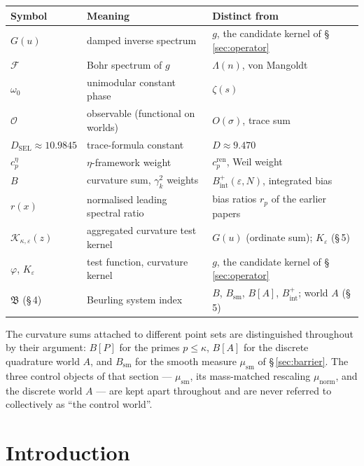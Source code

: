 \documentclass[11pt]{article}
\newcommand{\DSEL}{D_{\mathrm{SEL}}}
\newcommand{\Bsm}{B_{\mathrm{sm}}}              %
\begin{document}
\begin{center}
\begin{tabular}{lll}
\toprule
Symbol & Meaning & Distinct from \\
\midrule
$G(u)$ & damped inverse spectrum & $g$, the candidate kernel of
  \S\,\ref{sec:operator} \\
$\mathcal{F}$ & Bohr spectrum of $g$ & $\Lambda(n)$, von Mangoldt \\
$\omega_0$ & unimodular constant phase & $\zeta(s)$ \\
$\mathcal{O}$ & observable (functional on worlds) & $O(\sigma)$, trace sum \\
$\DSEL\approx 10.9845$ & trace-formula constant & $D\approx 9.470$ \\
$c_p^{\eta}$ & $\eta$-framework weight & $c_p^{\mathrm{ren}}$, Weil weight \\
$B$ & curvature sum, $\gamma_k^2$ weights &
  $B_{\mathrm{int}}^{+}(\varepsilon,N)$, integrated bias \\
$r(x)$ & normalised leading spectral ratio & bias ratios $r_p$ of the earlier
  papers \\
$\mathcal K_{\kappa,\varepsilon}(z)$ & aggregated curvature test kernel &
  $G(u)$ (ordinate sum); $K_\varepsilon$ (\S\,5) \\
$\varphi$, $K_\varepsilon$ & test function, curvature kernel & $g$, the
  candidate kernel of \S\,\ref{sec:operator} \\
$\mathfrak{B}$ (\S\,4) & Beurling system index & $B$, $\Bsm$, $B[A]$, $B_{\mathrm{int}}^{+}$; world $A$ (\S\,5) \\
\bottomrule
\end{tabular}
\end{center}

The curvature sums attached to different point sets are distinguished
throughout by their argument: $B[P]$ for the primes $p\le\kappa$, $B[A]$ for
the discrete quadrature world $A$, and $\Bsm$ for the smooth measure
$\mu_{\mathrm{sm}}$ of \S\,\ref{sec:barrier}. The three control objects of
that section --- $\mu_{\mathrm{sm}}$, its mass-matched rescaling
$\mu_{\mathrm{norm}}$, and the discrete world $A$ --- are kept apart
throughout and are never referred to collectively as ``the control world''.

\vspace{2em}
\newpage

\section{Introduction}
\label{sec:intro}
\end{document}
